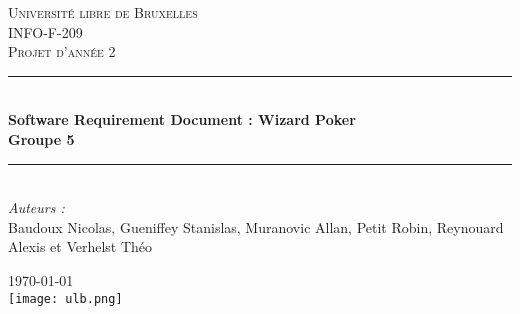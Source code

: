 \documentclass[12pt]{article}
\begin{document}

\begin{titlepage}

\newcommand{\HRule}{\rule{\linewidth}{0.5mm}} %

\center %


\textsc{\LARGE Université libre de Bruxelles}\\[1.5cm]
\textsc{\Large INFO-F-209}\\[0.5cm]
\textsc{\large Projet d'année 2}\\[0.5cm]


\HRule \\[0.4cm]
{ \huge \bfseries Software Requirement Document : Wizard Poker \\ Groupe 5}\\[0.4cm]
\HRule \\[1.5cm]


\Large \emph{Auteurs :}\\
Baudoux Nicolas, Gueniffey Stanislas,  Muranovic Allan, Petit Robin, Reynouard Alexis et Verhelst Théo


{\large \today}\\[2cm]


\texttt{[image: ulb.png]}\\[1cm]


\vfill

\end{titlepage}
\end{document}
